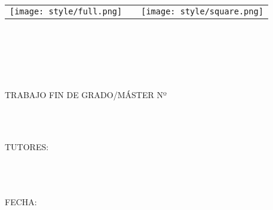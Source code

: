 \begin{titlepage}
    \centering
    \bfseries {
        \null{}
        \vspace{0cm}
        \begin{table}[h]
            \centering
            \begin{tabular}{m{10cm} m{1cm} m{3cm}}
                \vspace{0.2cm}
                \texttt{[image: style/full.png]} &  & \vspace{1.52mm} \texttt{[image: style/square.png]} \\
            \end{tabular}
        \end{table}

        \vspace{3\baselineskip}

        \Large{\ORG{} \\ \vspace{3\baselineskip}}
        \large {
            \AREA{} \\ \vspace{3\baselineskip}
            \subject{} \\ \vspace{2\baselineskip}

            TRABAJO FIN DE GRADO/MÁSTER Nº \tfgId{} \vspace{\baselineskip} \\
            \title{} \\ \vspace{1\baselineskip}

            \author{} \\ \vspace{1\baselineskip}
            TUTORES:\\
            \tutorOne{} \\
            \tutorTwo{} \\
            \tutorThree{} \\ \vspace{\baselineskip}

            \vspace{2\baselineskip}
            FECHA:\@ \date{}
        }
    }
\end{titlepage}
